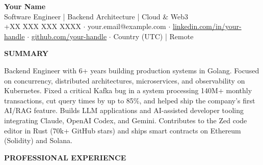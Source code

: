 \documentclass[10pt,a4paper]{article}
\newcommand{\cvsection}[1]{%
    \vspace{8pt}%
    {\large\bfseries\uppercase{#1}}\\[2pt]%
    \vspace{2pt}%
}
\begin{document}
\begin{center}
    {\LARGE\bfseries\color{headercolor} Your Name}\\[3pt]
    {\normalsize Software Engineer | Backend Architecture | Cloud \& Web3}\\[4pt]
    {\footnotesize +XX XXX XXX XXXX $\cdot$ your.email@example.com $\cdot$ \href{https://www.linkedin.com/in/your-handle/}{linkedin.com/in/your-handle} $\cdot$ \href{https://github.com/your-handle}{github.com/your-handle} $\cdot$ Country (UTC) | Remote}
\end{center}

\cvsection{Summary}
{\footnotesize Backend Engineer with 6+ years building production systems in Golang. Focused on concurrency, distributed architectures, microservices, and observability on Kubernetes. Fixed a critical Kafka bug in a system processing 140M+ monthly transactions, cut query times by up to 85\%, and helped ship the company's first AI/RAG feature. Builds LLM applications and AI-assisted developer tooling integrating Claude, OpenAI Codex, and Gemini. Contributes to the Zed code editor in Rust (70k+ GitHub stars) and ships smart contracts on Ethereum (Solidity) and Solana.}

\cvsection{Professional Experience}
\end{document}
